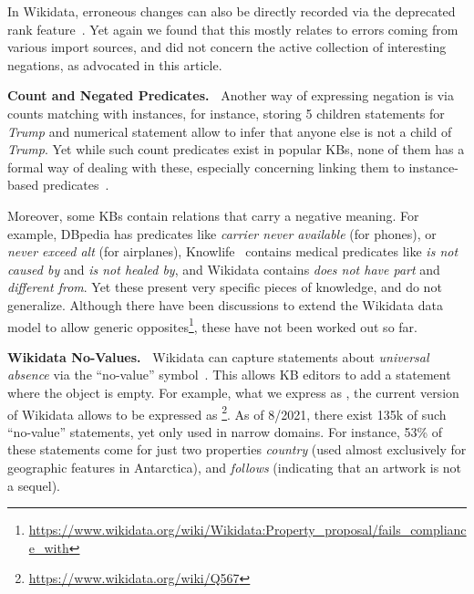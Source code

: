 In Wikidata, erroneous changes can also be directly recorded via the deprecated rank feature~\cite{MKGGB2018}. Yet again we found that this mostly relates to errors coming from various import sources, and did not concern the active collection of interesting negations, as advocated in this article.%

\noindent
\textbf{Count and Negated Predicates.\ }
Another way of expressing negation is via counts matching with instances, for instance, storing 5 children statements for \textit{Trump} and numerical statement  allow to infer that anyone else is not a child of \textit{Trump}. Yet while such count predicates exist in popular KBs, none of them has a formal way of dealing with these, especially concerning linking them to instance-based predicates~\cite{ghoshSWJ}.

Moreover, some KBs contain relations that carry a negative meaning. For example, DBpedia has predicates like \emph{carrier never available} (for phones), %
or \emph{never exceed alt} (for airplanes), %
Knowlife~\cite{ernst2015knowlife} contains medical predicates like \emph{is not caused by} %
and \emph{is not healed by}, %
and Wikidata contains \emph{does not have part} and %
\emph{different from}. %
Yet these present very specific pieces of knowledge, and do not generalize. %
Although there have been discussions to extend the Wikidata data model to allow generic opposites\footnote{\url{https://www.wikidata.org/wiki/Wikidata:Property_proposal/fails_compliance_with}}, these have not been worked out so far.

\noindent
\textbf{Wikidata No-Values.\ }
Wikidata can capture statements about \textit{universal absence} via the ``no-value'' symbol~\cite{erxleben2014introducing}. This allows KB editors to add a statement where the object is empty. For example, what we express as , the current version of Wikidata allows to be expressed as \footnote{\url{https://www.wikidata.org/wiki/Q567}}. As of 8/2021, there exist 135k of such ``no-value'' statements, yet only used in narrow domains. For instance, 53\% of these statements come for just two properties \textit{country} (used almost exclusively for geographic features in Antarctica), and \textit{follows} (indicating that an artwork is not a sequel).


